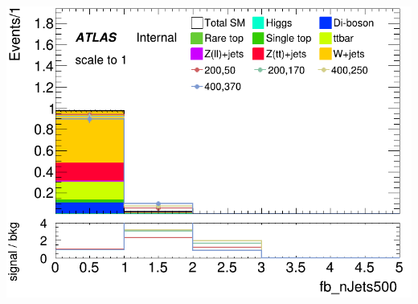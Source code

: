\documentclass[usenames,dvipsnames]{beamer}
\begin{document}
\begin{frame}
\begin{minipage}{0.32\textwidth}
        \includegraphics[width=\textwidth]{graphics/LH_met_sig/LH_fb_nJets500_norm.png}
    \end{minipage}
\end{frame}
\end{document}
